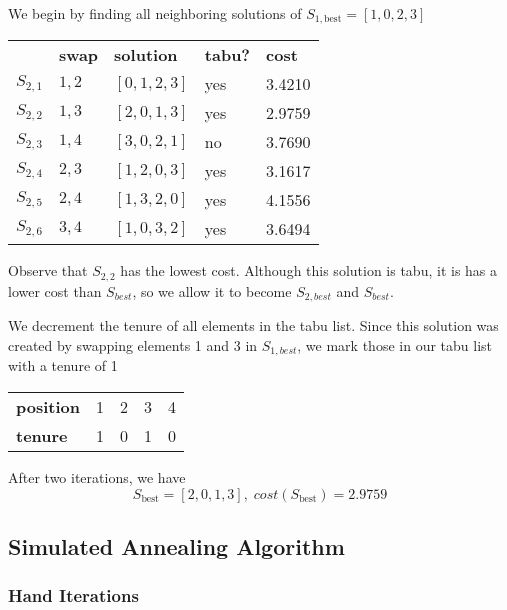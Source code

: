 \documentclass[a4paper]{article}
\begin{document}
We begin by finding all neighboring solutions of $S_{1, \text{best}} = [1, 0, 2, 3]$
\begin{center}
\begin{tabular}{lllll}
& \textbf{swap}   & \textbf{solution}    & \textbf{tabu?} & \textbf{cost}  \\
$S_{2,1}$ & $1,2$ & $[0, 1, 2, 3]$ & yes & 3.4210 \\
$S_{2,2}$ & $1,3$ & $[2, 0, 1, 3]$ & yes & 2.9759 \\
$S_{2,3}$ & $1,4$ & $[3, 0, 2, 1]$ & no  & 3.7690 \\
$S_{2,4}$ & $2,3$ & $[1, 2, 0, 3]$ & yes & 3.1617 \\
$S_{2,5}$ & $2,4$ & $[1, 3, 2, 0]$ & yes & 4.1556 \\
$S_{2,6}$ & $3,4$ & $[1, 0, 3, 2]$ & yes & 3.6494 \\
\end{tabular}
\end{center}
\vspace{1.5em}

Observe that $S_{2,2}$ has the lowest cost. Although this solution is tabu, it is has a lower cost than $S_\textit{best}$, so we allow it to become $S_{2, \textit{best}}$ and $S_\textit{best}$.

We decrement the tenure of all elements in the tabu list. Since this solution was created by swapping elements 1 and 3 in $S_{1, \textit{best}}$, we mark those in our tabu list with a tenure of 1

\begin{center}
\begin{tabular}{lllll}
\textbf{position} & 1 & 2 & 3 & 4 \\
\textbf{tenure}   & 1 & 0 & 1 & 0
\end{tabular}
\end{center}
\vspace{1.5em}

After two iterations, we have
$$S_{\text{best}} = [2, 0, 1, 3], \; \textit{cost}(S_{\text{best}}) = 2.9759$$

\subsection{Simulated Annealing Algorithm} %

\subsubsection{Hand Iterations}
\end{document}
